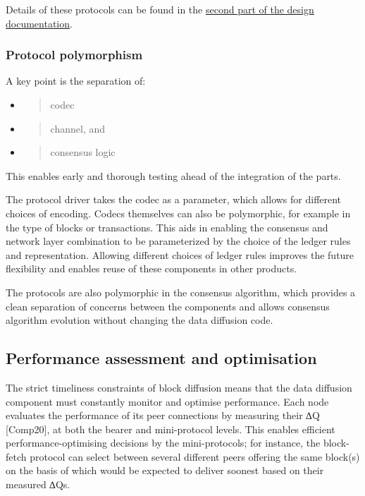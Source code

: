 \documentclass[11pt,a4paper]{article}
\begin{document}
Details of these protocols can be found in the
\href{https://hydra.iohk.io/build/1011577/download/1/network.pdf}{{second
part of the design documentation}}.

\subsubsection{Protocol polymorphism}
\label{protocol-polymorphism}

A key point is the separation of:

\begin{itemize}
\item
  \begin{quote}
  codec
  \end{quote}
\item
  \begin{quote}
  channel, and
  \end{quote}
\item
  \begin{quote}
  consensus logic
  \end{quote}
\end{itemize}

This enables early and thorough testing ahead of the integration of the
parts.

The protocol driver takes the codec as a parameter, which allows for
different choices of encoding. Codecs themselves can also be
polymorphic, for example in the type of blocks or transactions. This
aids in enabling the consensus and network layer combination to be
parameterized by the choice of the ledger rules and representation.
Allowing different choices of ledger rules improves the future
flexibility and enables reuse of these components in other products.

The protocols are also polymorphic in the consensus algorithm, which
provides a clean separation of concerns between the components and
allows consensus algorithm evolution without changing the data diffusion
code.

\subsection{Performance assessment and optimisation}
\label{performance-assessment-and-optimisation}

The strict timeliness constraints of block diffusion means that the data
diffusion component must constantly monitor and optimise performance.
Each node evaluates the performance of its peer connections by measuring
their ∆Q {[}Comp20{]}, at both the bearer and mini-protocol levels. This
enables efficient performance-optimising decisions by the
mini-protocols; for instance, the block-fetch protocol can select
between several different peers offering the same block(s) on the basis
of which would be expected to deliver soonest based on their measured
∆Qs.
\end{document}
